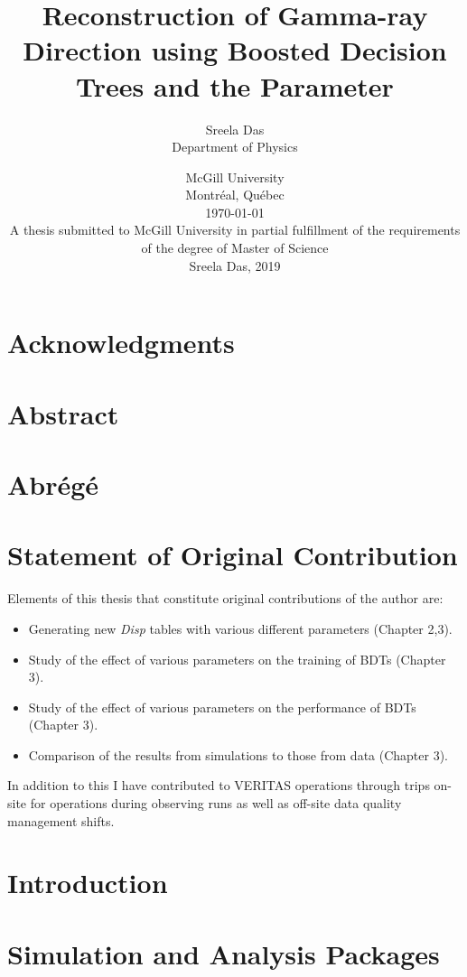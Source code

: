 \documentclass[openany, oneside, 12pt]{book}
\title{\Huge Reconstruction of Gamma-ray Direction using Boosted Decision Trees and the \disp Parameter \vspace{14pt}}
\author{\Large Sreela Das \\ \large Department of Physics \vspace{33pt}}
\date{\large McGill University \\ \large Montr\'eal, Qu\'ebec \\ \large \today \vspace{33pt}\\
  A thesis submitted to McGill University in partial fulfillment of the requirements of the degree of Master of Science\\ \vspace{30pt}\textcopyright \hspace{5pt}Sreela Das, 2019}
\newcommand{\disp}{\textit{Disp }}
\begin{document}
\clearpage
\frontmatter
\renewcommand{\chaptermark}[1]{\markboth{\MakeUppercase{\chaptername\ \thechapter.\ #1}}{}}
\maketitle
\clearpage
{}
\raggedright
\chapter{Acknowledgments}

\clearpage
\chapter{Abstract}

\clearpage
\chapter{Abr\'eg\'e}

\chapter{Statement of Original Contribution}
Elements of this thesis that constitute original contributions of the author are:
\begin{itemize}
\item Generating new \disp tables with various different parameters (Chapter 2,3).
\item Study of the effect of various parameters on the training of BDTs (Chapter 3).
\item Study of the effect of various parameters on the performance of BDTs (Chapter 3).
\item Comparison of the results from simulations to those from data (Chapter 3).
\end{itemize}
In addition to this I have contributed to VERITAS operations through trips on-site for operations during observing runs as well as off-site data quality management shifts.

\clearpage
\tableofcontents
\listoffigures
\listoftables
\mainmatter
\raggedbottom

\setlength\parindent{24pt}
\setlength\parskip{10pt}
\pagestyle{plain}

\chapter{Introduction}


\chapter{Simulation and Analysis Packages}

\end{document}
